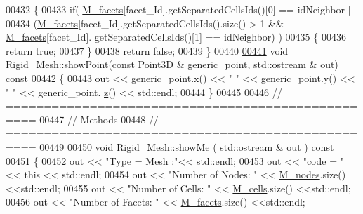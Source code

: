 \begin{DoxyCode}
00432 \textcolor{keyword}{}\{
00433     \textcolor{keywordflow}{if}( \hyperlink{classFVCode3D_1_1Rigid__Mesh_a62757eb1d9c54b4421880b3c271b4c3b}{M\_facets}[facet\_Id].getSeparatedCellsIds()[0] == idNeighbor ||
00434        (\hyperlink{classFVCode3D_1_1Rigid__Mesh_a62757eb1d9c54b4421880b3c271b4c3b}{M\_facets}[facet\_Id].getSeparatedCellsIds().size() > 1 && \hyperlink{classFVCode3D_1_1Rigid__Mesh_a62757eb1d9c54b4421880b3c271b4c3b}{M\_facets}[facet\_Id].
      getSeparatedCellsIds()[1] == idNeighbor) )
00435     \{
00436         \textcolor{keywordflow}{return} \textcolor{keyword}{true};
00437     \}
00438     \textcolor{keywordflow}{return} \textcolor{keyword}{false};
00439 \}
00440 
\hypertarget{RigidMesh_8cpp_source.tex_l00441}{}\hyperlink{classFVCode3D_1_1Rigid__Mesh_a3bbdb25ce1eddaf66316487bfc05e089}{00441} \textcolor{keywordtype}{void} \hyperlink{classFVCode3D_1_1Rigid__Mesh_a3bbdb25ce1eddaf66316487bfc05e089}{Rigid\_Mesh::showPoint}(\textcolor{keyword}{const} \hyperlink{classFVCode3D_1_1Point3D}{Point3D} & generic\_point, std::ostream & out)\textcolor{keyword}{
       const}
00442 \textcolor{keyword}{}\{
00443     out << generic\_point.\hyperlink{classFVCode3D_1_1Point3D_ae015d6aa31f8b304f69696bdcbd4da19}{x}() << \textcolor{stringliteral}{" "} << generic\_point.\hyperlink{classFVCode3D_1_1Point3D_a950abcabbf3bb32fc2daf64c28d77416}{y}() << \textcolor{stringliteral}{" "} << generic\_point.
      \hyperlink{classFVCode3D_1_1Point3D_a865109e2006cc1de3681ab601081f5aa}{z}() << std::endl;
00444 \}
00445 
00446 \textcolor{comment}{// ==================================================}
00447 \textcolor{comment}{// Methods}
00448 \textcolor{comment}{// ==================================================}
00449 
\hypertarget{RigidMesh_8cpp_source.tex_l00450}{}\hyperlink{classFVCode3D_1_1Rigid__Mesh_a41b79ff22b6d03329967d1ffbe463679}{00450} \textcolor{keywordtype}{void} \hyperlink{classFVCode3D_1_1Rigid__Mesh_a41b79ff22b6d03329967d1ffbe463679}{Rigid\_Mesh::showMe} ( std::ostream & out )\textcolor{keyword}{ const}
00451 \textcolor{keyword}{}\{
00452     out << \textcolor{stringliteral}{"Type = Mesh :"}<< std::endl;
00453     out << \textcolor{stringliteral}{"code = "} << \textcolor{keyword}{this} << std::endl;
00454     out << \textcolor{stringliteral}{"Number of Nodes: "} << \hyperlink{classFVCode3D_1_1Rigid__Mesh_a400c29e5aa35a8dbdbcdca33c104a4b9}{M\_nodes}.size() <<std::endl;
00455     out << \textcolor{stringliteral}{"Number of Cells: "} << \hyperlink{classFVCode3D_1_1Rigid__Mesh_ad19dc70b4efddafb6e8d8d4980bd23d6}{M\_cells}.size() <<std::endl;
00456     out << \textcolor{stringliteral}{"Number of Facets: "} << \hyperlink{classFVCode3D_1_1Rigid__Mesh_a62757eb1d9c54b4421880b3c271b4c3b}{M\_facets}.size() <<std::endl;

\end{DoxyCode}
